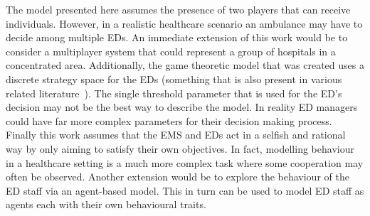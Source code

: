 The model presented here assumes the presence of two players that can receive 
individuals. 
However, in a realistic healthcare scenario an ambulance may have to decide 
among multiple EDs.
An immediate extension of this work would be to consider a multiplayer system
that could represent a group of hospitals in a concentrated area.
Additionally, the game theoretic model that was created uses a discrete 
strategy space for the EDs (something that is also present in various related 
literature~\cite{deo2011centralized, knight2017measuring}).
The single threshold parameter that is used for the ED's decision may not be 
the best way to describe the model.
In reality ED managers could have far more complex parameters for their 
decision making process.
Finally this work assumes that the EMS and EDs act in a selfish and rational
way by only aiming to satisfy their own objectives.
In fact, modelling behaviour in a healthcare setting is a much more complex 
task where some cooperation may often be observed.
Another extension would be to explore the behaviour of the ED staff via an 
agent-based model. 
This in turn can be used to model ED staff as agents each with their own 
behavioural traits.
